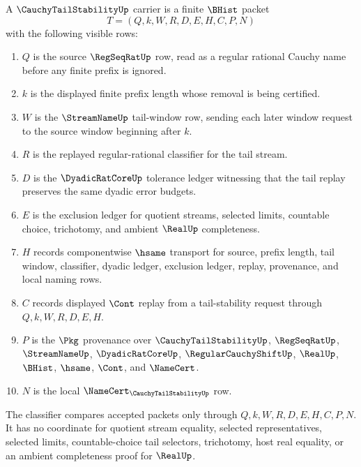\begin{definition}
\label{def:cauchy-tail-stability-carrier}
A $\CauchyTailStabilityUp$ carrier is a finite $\BHist$ packet
$$
T=(Q,k,W,R,D,E,H,C,P,N)
$$
with the following visible rows:
\begin{enumerate}
\item $Q$ is the source $\RegSeqRatUp$ row, read as a regular rational Cauchy name before any finite prefix is ignored.
\item $k$ is the displayed finite prefix length whose removal is being certified.
\item $W$ is the $\StreamNameUp$ tail-window row, sending each later window request to the source window beginning after $k$.
\item $R$ is the replayed regular-rational classifier for the tail stream.
\item $D$ is the $\DyadicRatCoreUp$ tolerance ledger witnessing that the tail replay preserves the same dyadic error budgets.
\item $E$ is the exclusion ledger for quotient streams, selected limits, countable choice, trichotomy, and ambient $\RealUp$ completeness.
\item $H$ records componentwise $\hsame$ transport for source, prefix length, tail window, classifier, dyadic ledger, exclusion ledger, replay, provenance, and local naming rows.
\item $C$ records displayed $\Cont$ replay from a tail-stability request through $Q,k,W,R,D,E,H$.
\item $P$ is the $\Pkg$ provenance over $\CauchyTailStabilityUp$, $\RegSeqRatUp$, $\StreamNameUp$, $\DyadicRatCoreUp$, $\RegularCauchyShiftUp$, $\RealUp$, $\BHist$, $\hsame$, $\Cont$, and $\NameCert$.
\item $N$ is the local $\NameCert_{\CauchyTailStabilityUp}$ row.
\end{enumerate}
The classifier compares accepted packets only through $Q,k,W,R,D,E,H,C,P,N$. It has no coordinate for quotient stream equality, selected representatives, selected limits, countable-choice tail selectors, trichotomy, host real equality, or an ambient completeness proof for $\RealUp$.
\end{definition}

